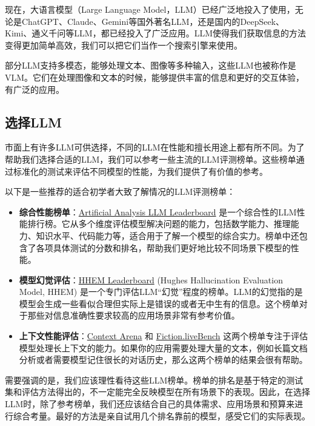 现在，大语言模型（Large Language Model，LLM）已经广泛地投入了使用，无论是ChatGPT、Claude、Gemini等国外著名LLM，还是国内的DeepSeek、Kimi、通义千问等LLM，都已经投入了广泛应用。LLM使得我们获取信息的方法变得更加简单高效，我们可以把它们当作一个搜索引擎来使用。

部分LLM支持多模态，能够处理文本、图像等多种输入，这些LLM也被称作是VLM。它们在处理图像和文本的时候，能够提供丰富的信息和更好的交互体验，有广泛的应用。

\subsection{选择LLM}

市面上有许多LLM可供选择，不同的LLM在性能和擅长用途上都有所不同。为了帮助我们选择合适的LLM，我们可以参考一些主流的LLM评测榜单。这些榜单通过标准化的测试来评估不同模型的性能，为我们提供了有价值的参考。

以下是一些推荐的适合初学者大致了解情况的LLM评测榜单：

\begin{itemize}
  \item \textbf{综合性能榜单}：\href{https://artificialanalysis.ai/leaderboards/models}{Artificial Analysis LLM Leaderboard} 是一个综合性的LLM性能排行榜。它从多个维度评估模型解决问题的能力，包括数学能力、推理能力、知识水平、代码能力等，适合用于了解一个模型的综合实力。榜单中还包含了各项具体测试的分数和排名，帮助我们更好地比较不同场景下模型的性能。
  \item \textbf{模型幻觉评估}：\href{https://vectara-leaderboard.hf.space/}{HHEM Leaderboard} (Hughes Hallucination Evaluation Model, HHEM) 是一个专门评估LLM“幻觉”程度的榜单。LLM的幻觉指的是模型会生成一些看似合理但实际上是错误的或者无中生有的信息。这个榜单对于那些对信息准确性要求较高的应用场景非常有参考价值。
  \item \textbf{上下文性能评估}：\href{https://contextarena.ai/}{Context Arena} 和 \href{https://fiction.live/stories/Fiction-liveBench-May-22-2025/oQdzQvKHw8JyXbN87}{Fiction.liveBench} 这两个榜单专注于评估模型处理长上下文的能力。如果你的应用需要处理大量的文本，例如长篇文档分析或者需要模型记住很长的对话历史，那么这两个榜单的结果会很有帮助。
\end{itemize}

需要强调的是，我们应该理性看待这些LLM榜单。榜单的排名是基于特定的测试集和评估方法得出的，不一定能完全反映模型在所有场景下的表现。因此，在选择LLM时，除了参考榜单，我们还应该结合自己的具体需求、应用场景和预算来进行综合考量。最好的方法是亲自试用几个排名靠前的模型，感受它们的实际表现。

